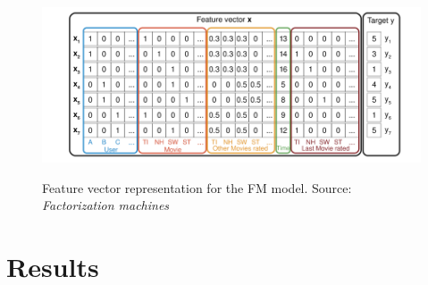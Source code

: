 \begin{figure}[h]
\centering
\caption{Feature vector representation for the FM model. Source: \textit{Factorization machines} \cite{rendle2010factorization}}
\includegraphics[scale=0.9]{images/featurevectors}
\label{fig:featurevector}
\end{figure}

\section{Results}
